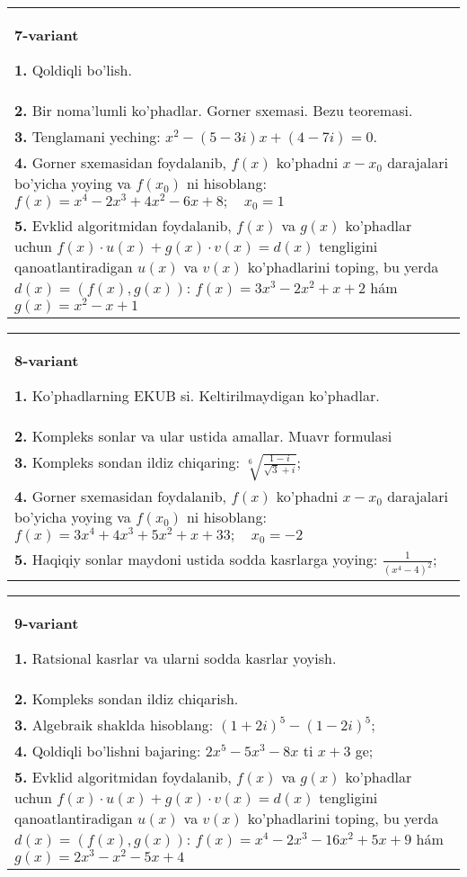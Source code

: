 \documentclass{article}
\begin{document}
\begin{tabular}{m{17cm}}
\textbf{7-variant}
\newline

\textbf{1.} Qoldiqli bo’lish.  \\
\textbf{2.} Bir noma’lumli ko’phadlar. Gorner sxemasi. Bezu teoremasi.  \\
\textbf{3.} Tenglamani yeching:  $x^2-(5-3 i) x+(4-7 i)=0$. \\
\textbf{4.} Gorner sxemasidan foydalanib, $f(x)$ ko’phadni $x-x_0$ darajalari bo’yicha yoying va $f\left(x_0\right)$ ni hisoblang: $f(x)=x^4-2 x^3+4 x^2-6 x+8 ; \quad x_0=1$ \\
\textbf{5.} Evklid algoritmidan foydalanib, $f(x)$ va $g(x)$ ko’phadlar uchun $f(x) \cdot u(x)+g(x) \cdot v(x)=d(x)$ tengligini qanoatlantiradigan $u(x)$ va $v(x)$ ko’phadlarini toping, bu yerda $d(x)=(f(x), g(x))$:  $f(x)=3 x^3-2 x^2+x+2$ hám $g(x)=x^2-x+1$ \\

\end{tabular}
\vspace{1cm}


\begin{tabular}{m{17cm}}
\textbf{8-variant}
\newline

\textbf{1.} Ko’phadlarning EKUB si. Keltirilmaydigan ko’phadlar. \\
\textbf{2.} Kompleks sonlar va ular ustida amallar. Muavr formulasi  \\
\textbf{3.} Kompleks sondan ildiz chiqaring: $\sqrt[6]{\frac{1-i}{\sqrt{3}+i}}$; \\
\textbf{4.} Gorner sxemasidan foydalanib, $f(x)$ ko’phadni $x-x_0$ darajalari bo’yicha yoying va $f\left(x_0\right)$ ni hisoblang: $f(x)=3 x^4+4 x^3+5 x^2+x+33 ; \quad x_0=-2$ \\
\textbf{5.} Haqiqiy sonlar maydoni ustida sodda kasrlarga yoying:  $\frac{1}{\left(x^4-4\right)^2}$; \\

\end{tabular}
\vspace{1cm}


\begin{tabular}{m{17cm}}
\textbf{9-variant}
\newline

\textbf{1.} Ratsional kasrlar va ularni sodda kasrlar yoyish. \\
\textbf{2.} Kompleks sondan ildiz chiqarish. \\
\textbf{3.} Algebraik shaklda hisoblang: $(1+2 i)^5-(1-2 i)^5$; \\
\textbf{4.} Qoldiqli bo’lishni bajaring: $2 x^5-5 x^3-8 x$ ti $x+3$ ge; \\
\textbf{5.} Evklid algoritmidan foydalanib, $f(x)$ va $g(x)$ ko’phadlar uchun $f(x) \cdot u(x)+g(x) \cdot v(x)=d(x)$ tengligini qanoatlantiradigan $u(x)$ va $v(x)$ ko’phadlarini toping, bu yerda $d(x)=(f(x), g(x))$:  $f(x)=x^4-2 x^3-16 x^2+5 x+9$ hám $g(x)=2 x^3-x^2-5 x+4$ \\

\end{tabular}
\vspace{1cm}
\end{document}

